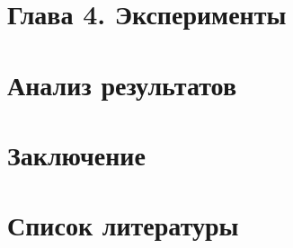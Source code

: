 \documentclass[a4paper]{report}
\begin{document}
	
	\section{Глава 4. Эксперименты}
	
	
	\newpage
	\section{Анализ результатов}
	
	
	\newpage
	\section{Заключение}
	
	
	
	\newpage
	\section{Список литературы}
	
\end{document}
